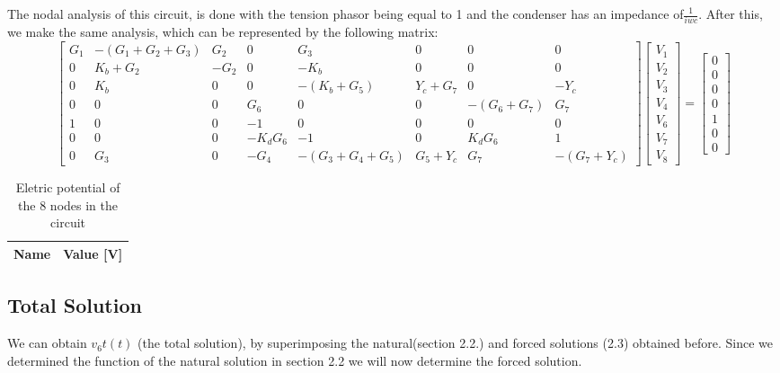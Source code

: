 The nodal analysis of this circuit, is done with the tension phasor being equal to 1 and the condenser has an impedance of$\frac{1}{iwc}$.
After this, we make the same analysis, which can be represented by the following matrix:
\begin{equation*}
	\begin{bmatrix}
		G_1 & -(G_1 + G_2 + G_3) & G_2 & 0 & G_3 & 0 & 0 & 0 \\ 
		0 & K_b + G_2 & -G_2 & 0 & -K_b & 0 & 0 & 0 \\
		0 & K_b & 0 & 0 & -(K_b + G_5) & Y_c + G_7 & 0 & -Y_c \\ 
		0 & 0 & 0 & G_6 & 0 & 0 & -(G_6 + G_7) & G_7 \\
		1 & 0 & 0 & -1 & 0 & 0 & 0 & 0 \\
		0 & 0 & 0 & -K_dG_6 & -1 & 0 & K_dG_6 & 1 \\
		0 & G_3 & 0 & -G_4 & -(G_3 + G_4 + G_5) & G_5 + Y_c & G_7 & -(G_7 + Y_c)
	\end{bmatrix}
	\begin{bmatrix} V_1 \\ V_2 \\ V_3 \\ V_4 \\ V_6 \\ V_7 \\ V_8 
	\end{bmatrix}
	=
	\begin{bmatrix} 0 \\ 0 \\ 0 \\ 0 \\ 1 \\ 0 \\ 0 
	\end{bmatrix}
\end{equation*}

\begin{table}[h!]
	\centering
	\begin{tabular}{|l|r|}
		\hline    
		{\bf Name} & {\bf Value [V]} \\ \hline
		
	\end{tabular}
	\caption{Eletric potential of the 8 nodes in the circuit}
	\label{tab:op}
\end{table}

\subsection{Total Solution}
We can obtain $v_6t(t)$ (the total solution), by superimposing the natural(section 2.2.) and forced solutions (2.3) obtained before. Since we determined the function of the natural solution in section 2.2 we will now determine the forced solution.

